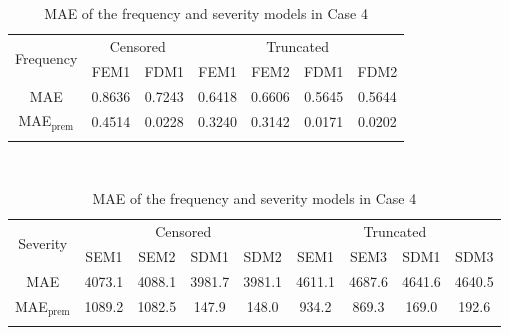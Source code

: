 \begin{table}[!h]
\renewcommand{\tabcolsep}{0.8mm}
\renewcommand{\arraystretch}{1}
\footnotesize
\centering
{\color{blue}
\begin{tabular}[h]{ccccccc}
\toprule
\multirow{2}{*}{Frequency} & \multicolumn{2}{c}{Censored} & \multicolumn{4}{c}{Truncated}\\
\cmidrule(l{3pt}r{3pt}){2-3} \cmidrule(l{3pt}r{3pt}){4-7}
 & FEM1 & FDM1 & FEM1 & FEM2 & FDM1 & FDM2\\
\midrule
MAE & 0.8636 & 0.7243 & 0.6418 & 0.6606 & 0.5645 & 0.5644 \\
MAE$_{\text{prem}}$ & 0.4514 & 0.0228 & 0.3240 & 0.3142 & 0.0171 & 0.0202 \\
\hhline{=======}
\end{tabular}
\\
\vspace{0.3cm}
\begin{tabular}[h]{ccccccccc}
\toprule
\multirow{2}{*}{Severity} & \multicolumn{4}{c}{Censored} & \multicolumn{4}{c}{Truncated}\\
\cmidrule(l{3pt}r{3pt}){2-5} \cmidrule(l{3pt}r{3pt}){6-9}
 & SEM1 & SEM2 & SDM1 & SDM2 & SEM1 & SEM3 & SDM1 & SDM3\\
\midrule
MAE & 4073.1 & 4088.1 & 3981.7 & 3981.1 & 4611.1 & 4687.6 & 4641.6 & 4640.5 \\
MAE$_{\text{prem}}$ & 1089.2 & 1082.5 & 147.9 & 148.0 & 934.2 & 869.3 & 169.0 & 192.6 \\
\hhline{=========}
\end{tabular}
}
\caption{MAE of the frequency and severity models in Case 4}\label{tab:maecase4}
\end{table}
